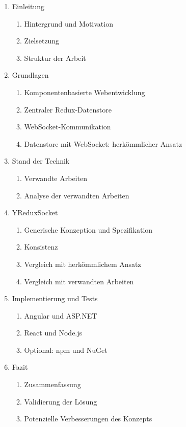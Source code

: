 \documentclass[12pt]{article} %
\begin{document}
\begin{enumerate}

\item Einleitung
\begin{enumerate}[label*=\arabic*]
\item Hintergrund und Motivation
\item Zielsetzung
\item Struktur der Arbeit
\end{enumerate}

\item Grundlagen
\begin{enumerate}[label*=\arabic*]
\item Komponentenbasierte Webentwicklung
\item Zentraler Redux-Datenstore
\item WebSocket-Kommunikation
\item Datenstore mit WebSocket: herkömmlicher Ansatz
\end{enumerate}

\item Stand der Technik
\begin{enumerate}[label*=\arabic*]
\item Verwandte Arbeiten
\item Analyse der verwandten Arbeiten
\end{enumerate}

\item YReduxSocket
\begin{enumerate}[label*=\arabic*]
\item Generische Konzeption und Spezifikation
\item Konsistenz
\item Vergleich mit herkömmlichem Ansatz
\item Vergleich mit verwandten Arbeiten
\end{enumerate}

\item Implementierung und Tests
\begin{enumerate}[label*=\arabic*]
\item Angular und ASP.NET
\item React und Node.js
\item Optional: npm und NuGet
\end{enumerate}

\item Fazit
\begin{enumerate}[label*=\arabic*]
\item Zusammenfassung
\item Validierung der Lösung
\item Potenzielle Verbesserungen des Konzepts
\end{enumerate}
\end{enumerate}
\end{document}
